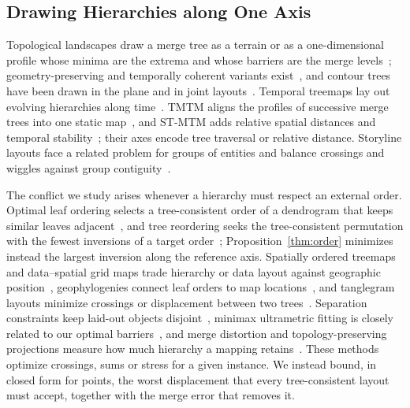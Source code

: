 \subsection{Drawing Hierarchies along One Axis}
Topological landscapes draw a merge tree as a terrain or as a one-dimensional profile whose minima are the extrema and whose barriers are the merge levels~\cite{Weber:2007:TL,Oesterling:2013:TLP}; geometry-preserving and temporally coherent variants exist~\cite{Beketayev:2012:GPTL,Herick:2020:TCTL}, and contour trees have been drawn in the plane and in joint layouts~\cite{Heine:2011:DCT,Lohfink:2020:FCT}. Temporal treemaps lay out evolving hierarchies along time~\cite{Koepp:2019:TT}. TMTM aligns the profiles of successive merge trees into one static map~\cite{Koepp:2023:TMTM}, and ST-MTM adds relative spatial distances and temporal stability~\cite{STMTM:2026}; their axes encode tree traversal or relative distance. Storyline layouts face a related problem for groups of entities and balance crossings and wiggles against group contiguity~\cite{Tanahashi:2012:Storyline,Liu:2013:SF}.

The conflict we study arises whenever a hierarchy must respect an external order. Optimal leaf ordering selects a tree-consistent order of a dendrogram that keeps similar leaves adjacent~\cite{BarJoseph:2001:OLO,Eisen:1998:CA}, and tree reordering seeks the tree-consistent permutation with the fewest inversions of a target order~\cite{Bulteau:2022:RT}; Proposition~\ref{thm:order} minimizes instead the largest inversion along the reference axis. Spatially ordered treemaps and data--spatial grid maps trade hierarchy or data layout against geographic position~\cite{Wood:2008:SOT,vanBeusekom:2023:DSL}, geophylogenies connect leaf orders to map locations~\cite{Klawitter:2025:GP}, and tanglegram layouts minimize crossings or displacement between two trees~\cite{Fernau:2010:CTC,Huson:2026:DOT}. Separation constraints keep laid-out objects disjoint~\cite{Dwyer:2006:IPSEP,Li:2019:SOI}, minimax ultrametric fitting is closely related to our optimal barriers~\cite{Farach:1995:RM}, and merge distortion and topology-preserving projections measure how much hierarchy a mapping retains~\cite{Eldridge:2015:MD,Doraiswamy:2021:TM}. These methods optimize crossings, sums or stress for a given instance. We instead bound, in closed form for points, the worst displacement that every tree-consistent layout must accept, together with the merge error that removes it.
